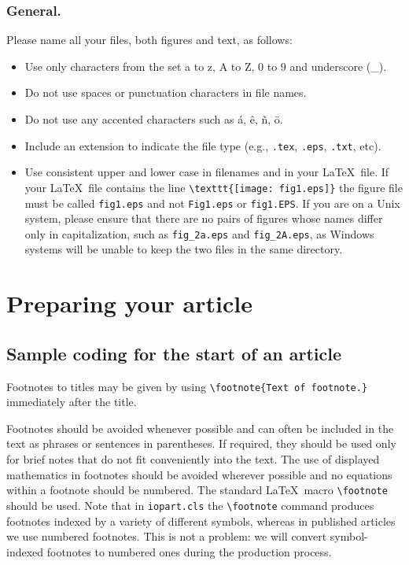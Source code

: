 \documentclass[12pt]{iopart}
\begin{document}
\subsubsection{General.}
Please name all your files, both figures and text, as follows:
\begin{itemize}
\item Use only characters from the set a to z, A to Z, 0 to 9 and underscore (\_).
\item Do not use spaces or punctuation characters in file names.
\item Do not use any accented characters such as
\'a, \^e, \~n, \"o.
\item Include an extension to indicate the file type (e.g., \verb".tex", \verb".eps", \verb".txt", etc).
\item Use consistent upper and lower case in filenames and in your \LaTeX\ file.
If your \LaTeX\ file contains the line \verb"\texttt{[image: fig1.eps]}" the figure file must be called
\verb"fig1.eps" and not \verb"Fig1.eps" or \verb"fig1.EPS".  If you are on a Unix system, please ensure that
there are no pairs of figures whose names differ only in capitalization, such as \verb"fig_2a.eps" and \verb"fig_2A.eps",
as Windows systems will be unable to keep the two files in the same directory.
\end{itemize}

\section{Preparing your article}

\subsection{Sample coding for the start of an article}

Footnotes to titles may be given by using \verb"\footnote{Text of footnote.}" immediately after the title.

Footnotes should be avoided whenever possible and can often be included
in the text as phrases or sentences in parentheses. If required, they
should be used only for brief notes that do not fit conveniently into the
text. The use of displayed mathematics in footnotes should be avoided
wherever possible and no equations within a footnote should be numbered.
The standard \LaTeX\ macro \verb"\footnote" should be used.  Note that in
\verb"iopart.cls" the \verb"\footnote" command produces footnotes indexed
by a variety of different symbols, whereas in published articles we use
numbered footnotes.  This is not a problem: we will convert
symbol-indexed footnotes to numbered ones during the production process.
\end{document}
